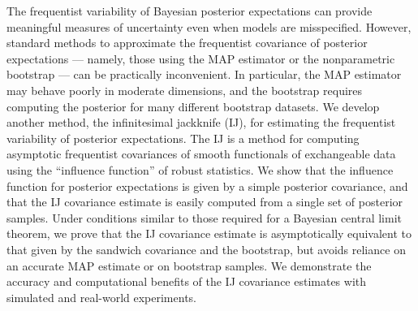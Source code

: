 The frequentist variability of Bayesian posterior expectations can provide
meaningful measures of uncertainty even when models are
misspecified. However, standard methods to approximate the frequentist
covariance of posterior expectations — namely, those using the MAP estimator or
the nonparametric bootstrap — can be practically inconvenient. In particular,
the MAP estimator may behave poorly in moderate dimensions, and the bootstrap
requires computing the posterior for many different bootstrap datasets.  We
develop another method, the infinitesimal jackknife (IJ), for
estimating the frequentist variability of posterior expectations.  The IJ is a
method for computing asymptotic frequentist covariances of smooth
functionals of exchangeable data using the ``influence function'' of
robust statistics.  We show that the influence function for posterior
expectations is given by a simple posterior covariance, and that the IJ
covariance estimate is easily computed from a single set of posterior
samples. Under conditions similar to those required for a Bayesian central limit
theorem, we prove that the IJ covariance estimate is
asymptotically equivalent to that given by the sandwich covariance and the
bootstrap, but avoids reliance on an accurate MAP estimate or on bootstrap
samples. We demonstrate the accuracy and computational benefits of the IJ
covariance estimates with simulated and real-world experiments.